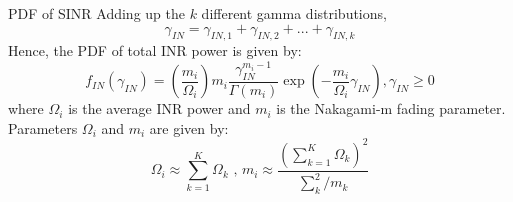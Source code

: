 \documentclass{beamer}
\providecommand{\brak}[1]{\ensuremath{\left(#1\right)}}
\begin{document}
\begin{frame}{PDF of SINR}
    Adding up the $k$ different gamma distributions,
    \begin{equation}
        \nonumber\gamma_{IN} = \gamma_{IN,1} + \gamma_{IN,2} + ... + \gamma_{IN,k}
    \end{equation}
    Hence, the PDF of total INR power is given by:
    \begin{equation}
         f_{IN}\brak{\gamma_{IN}} = \brak{\frac{m_{i}}{\Omega_{i}}}m_{i}\frac{\gamma_{IN}^{m_{i}-1}}{\Gamma\brak{m_{i}}}\exp\brak{-\frac{m_{i}}{\Omega_{i}}\gamma_{IN}}, \gamma_{IN}\geq{0}\label{eq:5}
    \end{equation}
    where $\Omega_{i}$ is the average INR power and $m_{i}$ is the Nakagami-m fading parameter.\\
    Parameters $\Omega_{i}$ and $m_{i}$ are given by:
    \begin{equation}
        \Omega_{i}\approx\sum_{k=1}^{K}\Omega_{k}\text{ , } m_{i}\approx\frac{\brak{\sum_{k=1}^{K}\Omega_{k}}^2}{\sum_{k}^{2}/m_{k}}
    \end{equation}
\end{frame}
\end{document}
